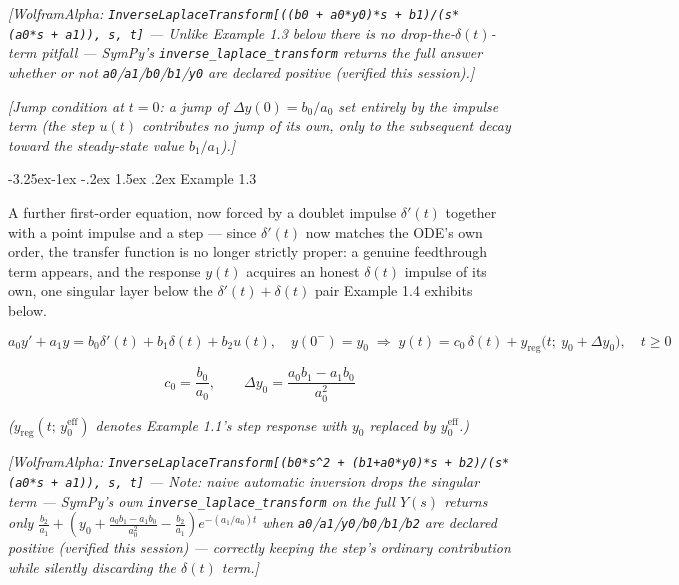 \documentclass[
  11pt,
]{article}
\makeatletter
\providecommand{\implies}{\Longrightarrow}
\renewcommand\paragraph{\@startsection{paragraph}{4}{\z@}%
                                     {-3.25ex\@plus -1ex \@minus -.2ex}%
                                     {1.5ex \@plus .2ex}%
                                     {\normalfont\normalsize\bfseries}}
\makeatother
\begin{document}
\emph{{[}WolframAlpha:
\texttt{InverseLaplaceTransform{[}((b0\ +\ a0*y0)*s\ +\ b1)/(s*(a0*s\ +\ a1)),\ s,\ t{]}}
--- Unlike Example 1.3 below there is no drop-the-\(\delta(t)\)-term
pitfall --- SymPy's \texttt{inverse\_laplace\_transform} returns the
full answer whether or not
\texttt{a0}/\texttt{a1}/\texttt{b0}/\texttt{b1}/\texttt{y0} are declared
positive (verified this session).{]}}

\emph{{[}Jump condition at \(t=0\): a jump of \(\Delta y(0)=b_0/a_0\)
set entirely by the impulse term (the step \(u(t)\) contributes no jump
of its own, only to the subsequent decay toward the steady-state value
\(b_1/a_1\)).{]}}

\hypertarget{example-1.3}{%
\paragraph{Example 1.3}\label{example-1.3}}

A further first-order equation, now forced by a doublet impulse
\(\delta'(t)\) together with a point impulse and a step --- since
\(\delta'(t)\) now matches the ODE's own order, the transfer function is
no longer strictly proper: a genuine feedthrough term appears, and the
response \(y(t)\) acquires an honest \(\delta(t)\) impulse of its own,
one singular layer below the \(\delta'(t)+\delta(t)\) pair Example 1.4
exhibits below.

\[
a_0 y' + a_1 y = b_0 \delta'(t) + b_1 \delta(t) + b_2 u(t), \quad y(0^-) = y_0 \;\implies\; y(t) = c_0\,\delta(t) + y_{\text{reg}}\big(t;\ y_0+\Delta y_0\big), \quad t \geq 0
\]

\[
c_0 = \frac{b_0}{a_0}, \qquad \Delta y_0 = \frac{a_0 b_1 - a_1 b_0}{a_0^2}
\]

\emph{(\(y_{\text{reg}}(t;\,y_0^{\text{eff}})\) denotes Example 1.1's
step response with \(y_0\) replaced by \(y_0^{\text{eff}}\).)}

\emph{{[}WolframAlpha:
\texttt{InverseLaplaceTransform{[}(b0*s\^{}2\ +\ (b1+a0*y0)*s\ +\ b2)/(s*(a0*s\ +\ a1)),\ s,\ t{]}}
--- Note: naive automatic inversion drops the singular term --- SymPy's
own \texttt{inverse\_laplace\_transform} on the full \(Y(s)\) returns
only
\(\frac{b_2}{a_1} + \left(y_0+\frac{a_0b_1-a_1b_0}{a_0^2}-\frac{b_2}{a_1}\right)e^{-(a_1/a_0)t}\)
when
\texttt{a0}/\texttt{a1}/\texttt{y0}/\texttt{b0}/\texttt{b1}/\texttt{b2}
are declared positive (verified this session) --- correctly keeping the
step's ordinary contribution while silently discarding the \(\delta(t)\)
term.{]}}
\end{document}
